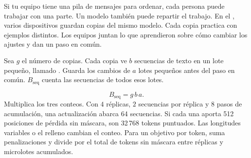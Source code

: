 {Si tu equipo tiene una pila de mensajes para ordenar, cada persona puede trabajar con una parte. Un modelo también puede repartir el trabajo. En el , varios dispositivos guardan copias del mismo modelo. Cada copia practica con ejemplos distintos. Los equipos juntan lo que aprendieron sobre cómo cambiar los ajustes y dan un paso en común.

\moremath
Sea \(g\) el número de copias. Cada copia ve \(b\) secuencias de texto en un lote pequeño, llamado . Guarda los cambios de \(a\) lotes pequeños antes del paso en común. \(B_{\mathrm{seq}}\) cuenta las secuencias de todos esos lotes.}
\begin{equation}
 B_{\mathrm{seq}}=g\,b\,a .
 \label{eq:batch}
\end{equation}
{Multiplica los tres conteos. Con \(4\) réplicas, \(2\) secuencias por réplica y \(8\) pasos de acumulación, una actualización abarca 64 secuencias. Si cada una aporta 512 posiciones de pérdida sin máscara, son 32\,768 tokens puntuados. Las longitudes variables o el relleno cambian el conteo. Para un objetivo por token, suma penalizaciones y divide por el total de tokens sin máscara entre réplicas y microlotes acumulados.}

